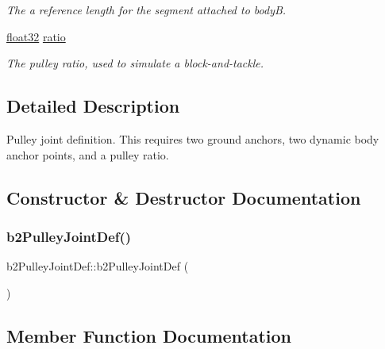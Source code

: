 \begin{DoxyCompactItemize}
\begin{DoxyCompactList}\small\item\em The a reference length for the segment attached to bodyB. \end{DoxyCompactList}\item 
\mbox{\hyperlink{b2_settings_8h_aacdc525d6f7bddb3ae95d5c311bd06a1}{float32}} \mbox{\hyperlink{structb2_pulley_joint_def_af35074246aeacbf239c11682642b31f5}{ratio}}
\begin{DoxyCompactList}\small\item\em The pulley ratio, used to simulate a block-\/and-\/tackle. \end{DoxyCompactList}\end{DoxyCompactItemize}


\subsection{Detailed Description}
Pulley joint definition. This requires two ground anchors, two dynamic body anchor points, and a pulley ratio. 

\subsection{Constructor \& Destructor Documentation}
\mbox{\label{structb2_pulley_joint_def_ab006bb8b7ea6bea6e0fd8cbaaacb33b0}} 
\subsubsection{\texorpdfstring{b2PulleyJointDef()}{b2PulleyJointDef()}}
{\footnotesize\ttfamily b2\+Pulley\+Joint\+Def\+::b2\+Pulley\+Joint\+Def (\begin{DoxyParamCaption}{ }\end{DoxyParamCaption})\hspace{0.3cm}{\ttfamily [inline]}}



\subsection{Member Function Documentation}
\mbox{\label{structb2_pulley_joint_def_abef614a93562b82aa3b5f8cac17d1ce8}} 

